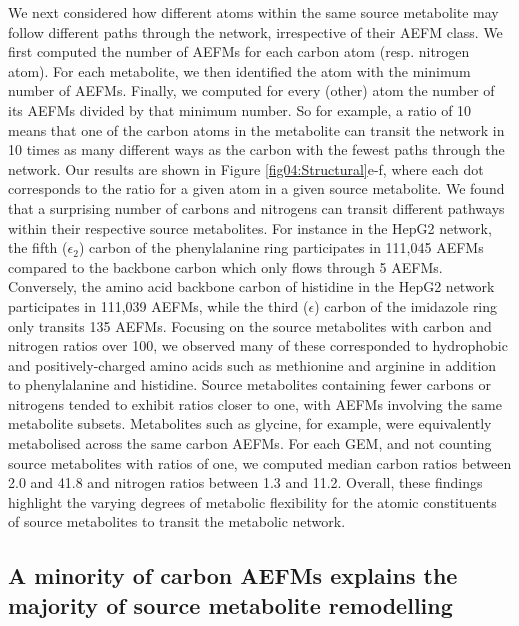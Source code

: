 \documentclass[12pt]{article}
\begin{document}
We next considered how different atoms within the same source metabolite
may follow different paths through the network, irrespective of their AEFM
class. We first computed the number of AEFMs for each carbon atom (resp.
nitrogen atom). For each metabolite, we then identified the atom with the
minimum number of AEFMs. Finally, we computed for every (other) atom the
number of its AEFMs divided by that minimum number. So for example,
a ratio of 10 means that one of the carbon atoms in the metabolite can
transit the network in 10 times as many different ways as the carbon with
the fewest paths through the network. Our results are shown in Figure
\ref{fig04:Structural}e-f, where each dot corresponds to the ratio for
a given atom in a given source metabolite. We found that a surprising
number of carbons and nitrogens can transit different pathways within
their respective source metabolites. For instance in the HepG2 network,
the fifth ($\epsilon_2$) carbon of the phenylalanine ring participates in
111,045 AEFMs compared to the backbone carbon which only flows through
5 AEFMs. Conversely, the amino acid backbone carbon of histidine in the
  HepG2 network participates in 111,039 AEFMs, while the third
  ($\epsilon$) carbon of the imidazole ring only transits 135 AEFMs.
  Focusing on the source metabolites with carbon and nitrogen ratios over
  100, we observed many of these corresponded to hydrophobic and
  positively-charged amino acids such as methionine and arginine in
  addition to phenylalanine and histidine. Source metabolites containing
  fewer carbons or nitrogens tended to exhibit ratios closer to one, with
  AEFMs involving the same metabolite subsets. Metabolites such as
  glycine, for example, were equivalently metabolised across the same
  carbon AEFMs. For each GEM, and not counting source metabolites with
  ratios of one, we computed median carbon ratios between
  2.0 and 41.8 and nitrogen ratios between 1.3 and
  11.2. Overall, these findings highlight the varying degrees of metabolic
  flexibility for the atomic constituents of source metabolites to transit
  the metabolic network.

\subsection*{A minority of carbon AEFMs explains the majority of source metabolite remodelling}

\end{document}
